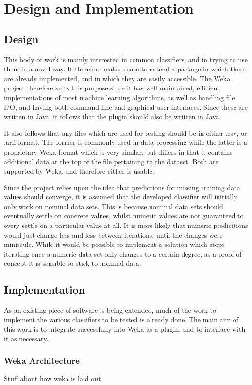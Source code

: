 \newpage
\chapter{Design and Implementation} 
\section{Design}
This body of work is mainly interested in common classifiers, and in trying to use them in a novel way. It therefore makes sense to extend a package in which these are already implemented, and in which they are easily accessible. The Weka project therefore suits this purpose since it has well maintained, efficient implementations of most machine learning algorithms, as well as handling file I/O, and having both command line and graphical user interfaces. Since these are written in Java, it follows that the plugin should also be written in Java.

It also follows that any files which are used for testing should be in either .csv, or .arff format. The former is commonly used in data processing while the latter is a proprietary Weka format which is very similar, but differs in that it contains additional data at the top of the file pertaining to the dataset. Both are supported by Weka, and therefore either is usable.

Since the project relies upon the idea that predictions for missing training data values should converge, it is assumed that the developed classifier will initially only work on nominal data sets. This is because nominal data sets should eventually settle on concrete values, whilst numeric values are not guaranteed to every settle on a particular value at all. It is more likely that numeric predicitions would just change less and less between iterations, until the changes were miniscule. While it would be possible to implement a solution which stops iterating once a numeric data set only changes to a certain degree, as a proof of concept it is sensible to stick to nominal data.

\section{Implementation}
As an existing piece of software is being extended, much of the work to implement the various classifiers to be tested is already done. The main aim of this work is to integrate successfully into Weka as a plugin, and to interface with it as necessary.
\subsection{Weka Architecture}
Stuff about how weka is laid out
